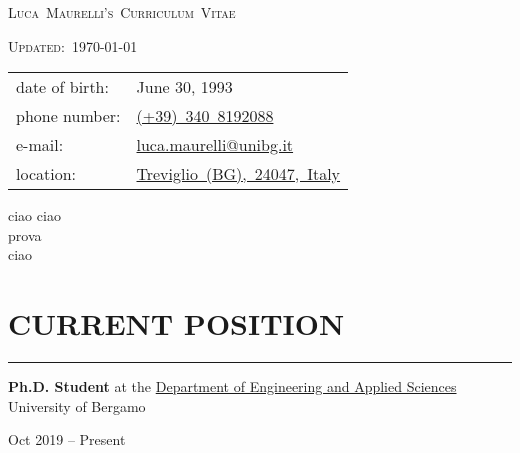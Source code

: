 \documentclass[10pt]{article}
\newcommand{\cvsection}[1]{\section*{\centering\normalsize\uppercase{#1}}\vspace{-16pt}\rule{\linewidth}{0.2pt}\vspace{6pt}}
\begin{document}
\centering
{\huge\textsc{Luca~Maurelli's~Curriculum~Vitae}\par}
{\textsc{Updated:~}\today\par}
\raggedright
\vspace{1cm}

\noindent
\begin{minipage}[t]{.5\textwidth}
	\raggedright
	\begin{tabular}{@{}ll@{}}
	date of birth: & June 30, 1993 \\
	phone number: & \href{tel:+393408192088}{(+39)~340~8192088} \\
	e-mail: & \href{mailto:luca.maurelli@unibg.it}{luca.maurelli@unibg.it} \\
	location: & \href{https://goo.gl/maps/qSb6hkSyAdgnEt5w7}{Treviglio~(BG),~24047,~Italy}
	\end{tabular}
\end{minipage}%
\begin{minipage}[t]{.5\textwidth}
	\raggedleft
	ciao ciao \\ 
	prova \\
	ciao
\end{minipage}

\cvsection{current position}

\noindent
\begin{minipage}[t]{.8\textwidth}
	\textbf{Ph.D. Student} at the \href{https://disa.unibg.it/}{Department of Engineering and Applied Sciences} \\
	University of Bergamo
\end{minipage}%
\hfill\vrule\hfill
\begin{minipage}[t]{.16\textwidth}
	\raggedleft
	Oct 2019 – Present
\end{minipage}
\end{document}
